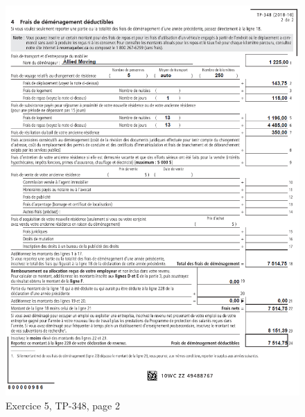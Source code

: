 \begin{figure}
	\centering
	\includegraphics[width=.9\textwidth]{exercice/3-5/Q5/TP-348-p2.png}
	\caption{Exercice 5, TP-348, page 2}
	\label{fig:chap3Exercice5TP3482}
\end{figure}



